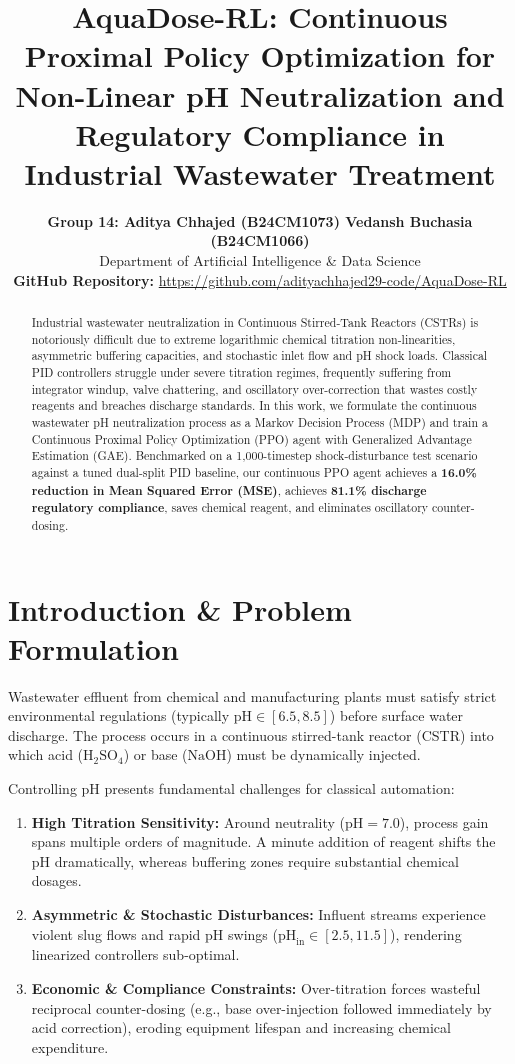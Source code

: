 \documentclass[10pt,twocolumn,a4paper]{article}
\title{\vspace{-10pt}\textbf{\Large AquaDose-RL: Continuous Proximal Policy Optimization for Non-Linear pH Neutralization and Regulatory Compliance in Industrial Wastewater Treatment}\vspace{-4pt}}
\author{
    \textbf{Group 14: Aditya Chhajed (B24CM1073) \quad Vedansh Buchasia (B24CM1066)} \\
    Department of Artificial Intelligence \& Data Science \\[3pt]
    \textbf{GitHub Repository:} \url{https://github.com/adityachhajed29-code/AquaDose-RL}
}
\date{}
\begin{document}
\maketitle
\vspace{-18pt}

\begin{abstract}
\noindent Industrial wastewater neutralization in Continuous Stirred-Tank Reactors (CSTRs) is notoriously difficult due to extreme logarithmic chemical titration non-linearities, asymmetric buffering capacities, and stochastic inlet flow and pH shock loads. Classical PID controllers struggle under severe titration regimes, frequently suffering from integrator windup, valve chattering, and oscillatory over-correction that wastes costly reagents and breaches discharge standards. In this work, we formulate the continuous wastewater pH neutralization process as a Markov Decision Process (MDP) and train a Continuous Proximal Policy Optimization (PPO) agent with Generalized Advantage Estimation (GAE). Benchmarked on a 1,000-timestep shock-disturbance test scenario against a tuned dual-split PID baseline, our continuous PPO agent achieves a \textbf{16.0\% reduction in Mean Squared Error (MSE)}, achieves \textbf{81.1\% discharge regulatory compliance}, saves chemical reagent, and eliminates oscillatory counter-dosing.
\end{abstract}

\section{Introduction \& Problem Formulation}
Wastewater effluent from chemical and manufacturing plants must satisfy strict environmental regulations (typically $\text{pH} \in [6.5, 8.5]$) before surface water discharge. The process occurs in a continuous stirred-tank reactor (CSTR) into which acid ($\text{H}_2\text{SO}_4$) or base ($\text{NaOH}$) must be dynamically injected. 

Controlling pH presents fundamental challenges for classical automation:
\begin{enumerate}
    \item \textbf{High Titration Sensitivity:} Around neutrality ($\text{pH} = 7.0$), process gain spans multiple orders of magnitude. A minute addition of reagent shifts the pH dramatically, whereas buffering zones require substantial chemical dosages.
    \item \textbf{Asymmetric & Stochastic Disturbances:} Influent streams experience violent slug flows and rapid pH swings ($\text{pH}_{\text{in}} \in [2.5, 11.5]$), rendering linearized controllers sub-optimal.
    \item \textbf{Economic \& Compliance Constraints:} Over-titration forces wasteful reciprocal counter-dosing (e.g., base over-injection followed immediately by acid correction), eroding equipment lifespan and increasing chemical expenditure.
\end{enumerate}
\end{document}
